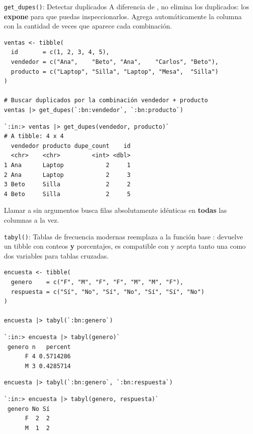 \documentclass[8pt]{beamer}
\begin{document}
	\begin{frame}[fragile]{\texttt{get\_dupes()}: Detectar duplicados}
		A diferencia de ,  no elimina los duplicados: los \textbf{expone} para que puedas inspeccionarlos. Agrega automáticamente la columna  con la cantidad de veces que aparece cada combinación.

\begin{lstlisting}[style=RScript]
ventas <- tibble(
  id       = c(1, 2, 3, 4, 5),
  vendedor = c("Ana",    "Beto", "Ana",    "Carlos", "Beto"),
  producto = c("Laptop", "Silla", "Laptop", "Mesa",  "Silla")
)

# Buscar duplicados por la combinación vendedor + producto
ventas |> get_dupes(`:bn:vendedor`, `:bn:producto`)
\end{lstlisting}
\begin{lstlisting}[style=RConsole]
`:in:> ventas |> get_dupes(vendedor, producto)`
# A tibble: 4 x 4
  vendedor producto dupe_count    id
  <chr>    <chr>         <int> <dbl>
1 Ana      Laptop            2     1
2 Ana      Laptop            2     3
3 Beto     Silla             2     2
4 Beto     Silla             2     5
\end{lstlisting}

		\begin{alertblock}{}
			Llamar a  sin argumentos busca filas absolutamente idénticas en \textbf{todas} las columnas a la vez.
		\end{alertblock}
	\end{frame}


	\begin{frame}[fragile]{\texttt{tabyl()}: Tablas de frecuencia modernas}
		 reemplaza a la función base : devuelve un tibble con conteos \textbf{y} porcentajes, es compatible con \rscript{|>} y acepta tanto una como dos variables para tablas cruzadas.

\begin{lstlisting}[style=RScript]
encuesta <- tibble(
  genero    = c("F", "M", "F", "F", "M", "M", "F"),
  respuesta = c("Sí", "No", "Sí", "No", "Sí", "Sí", "No")
)

encuesta |> tabyl(`:bn:genero`)
\end{lstlisting}
\begin{lstlisting}[style=RConsole]
`:in:> encuesta |> tabyl(genero)`
 genero n   percent
      F 4 0.5714286
      M 3 0.4285714
\end{lstlisting}

\begin{lstlisting}[style=RScript]
encuesta |> tabyl(`:bn:genero`, `:bn:respuesta`)
\end{lstlisting}
\begin{lstlisting}[style=RConsole]
`:in:> encuesta |> tabyl(genero, respuesta)`
 genero No Sí
      F  2  2
      M  1  2
\end{lstlisting}
	\end{frame}
\end{document}
